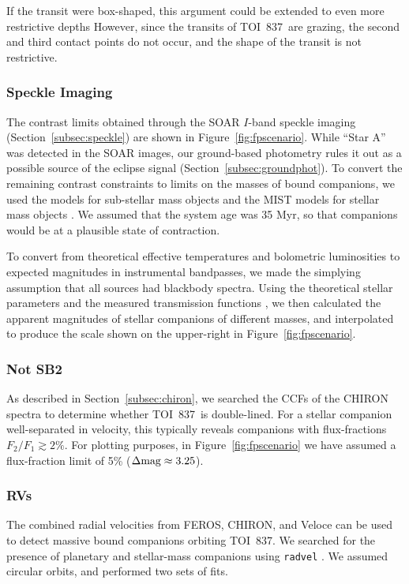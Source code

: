 \documentclass[12pt,twocolumn,tighten]{aastex63}
\newcommand{\tn}{TOI~837} %
\begin{document}
If the transit were box-shaped, this argument could be extended to
even more restrictive depths \citep[{\it
e.g.},][]{seager_unique_2003,vanderburg_hr858_2019,rizzuto_tess_2020}
However, since the transits of \tn\ are grazing, the second and third
contact points do not occur, and the shape of the transit is not
restrictive.

\subsubsection{Speckle Imaging}
The contrast limits obtained through the SOAR $I$-band speckle imaging
(Section~\ref{subsec:speckle}) are shown in
Figure~\ref{fig:fpscenario}.  While ``Star A'' was detected in the
SOAR images, our ground-based photometry rules it out as a possible
source of the eclipse signal (Section~\ref{subsec:groundphot}).  To
convert the remaining contrast constraints to limits on the masses of
bound companions, we used the \citet{baraffe_evolutionary_2003} models
for sub-stellar mass objects and the MIST models for stellar mass
objects
\citep{paxton_modules_2011,paxton_modules_2013,paxton_modules_2015,dotter_mesa_2016,choi_mesa_2016}.
We assumed that the system age was 35 Myr, so that companions would be
at a plausible state of contraction.

To convert from theoretical effective temperatures and bolometric
luminosities to expected magnitudes in instrumental bandpasses, we
made the simplying assumption that all sources had blackbody spectra.
Using the theoretical stellar parameters and the measured transmission
functions \citep{tokovinin_ten_2018}, we then calculated the apparent
magnitudes of stellar companions of different masses, and interpolated
to produce the scale shown on the upper-right in
Figure~\ref{fig:fpscenario}.

\subsubsection{Not SB2}
As described in Section~\ref{subsec:chiron}, we searched the CCFs of
the CHIRON spectra to determine whether \tn\ is double-lined.  For a
stellar companion well-separated in velocity, this typically reveals
companions with flux-fractions $F_2/F_1 \gtrsim 2\%$.  For plotting
purposes, in Figure~\ref{fig:fpscenario} we have assumed a
flux-fraction limit of 5\% ($\Delta {\rm mag} \approx 3.25$).

\subsubsection{RVs}
The combined radial velocities from FEROS, CHIRON, and Veloce can be
used to detect massive bound companions orbiting \tn.  We searched for
the presence of planetary and stellar-mass companions using
\texttt{radvel} \citep{fulton_radvel_2018}.  We assumed circular
orbits, and performed two sets of fits.
\end{document}
